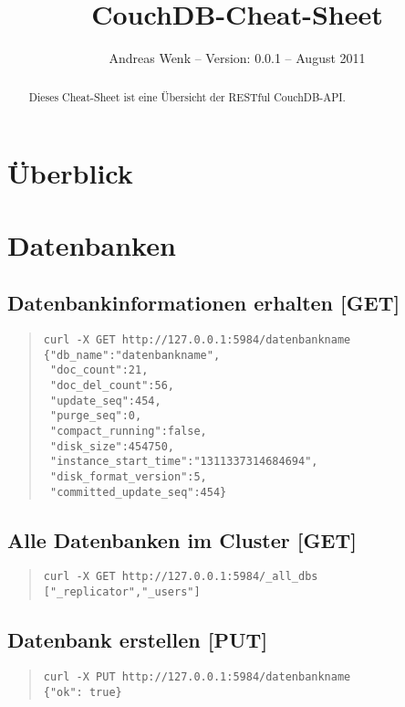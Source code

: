 \documentclass[19pt,landscape,twocolumn]{article}
\newcommand{\htmlverb}[1]{{[}\textbf{{#1}}{]}}
\begin{document}
\fontsize{9}{10}\selectfont

\title{CouchDB-Cheat-Sheet}
\author{Andreas Wenk -- Version: 0.0.1 -- August 2011}
\date{}
\maketitle

\begin{abstract}
Dieses Cheat-Sheet ist eine Übersicht der RESTful CouchDB-API.
\end{abstract}

\section{Überblick}

\section{Datenbanken}
\subsection{Datenbankinformationen erhalten \htmlverb{GET}}
\begin{quote}
\begin{verbatim}
curl -X GET http://127.0.0.1:5984/datenbankname
{"db_name":"datenbankname",
 "doc_count":21,
 "doc_del_count":56,
 "update_seq":454,
 "purge_seq":0,
 "compact_running":false,
 "disk_size":454750,
 "instance_start_time":"1311337314684694",
 "disk_format_version":5,
 "committed_update_seq":454}
\end{verbatim}
\end{quote}

\subsection{Alle Datenbanken im Cluster \htmlverb{GET}}
\begin{quote}
\begin{verbatim}
curl -X GET http://127.0.0.1:5984/_all_dbs
["_replicator","_users"]
\end{verbatim}
\end{quote}

\subsection{Datenbank erstellen \htmlverb{PUT}}
\begin{quote}
\begin{verbatim}
curl -X PUT http://127.0.0.1:5984/datenbankname
{"ok": true}
\end{verbatim}
\end{quote}
\end{document}
